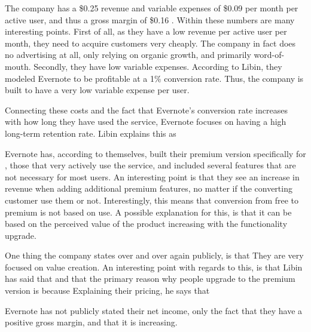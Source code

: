 The company has a \$0.25  revenue and variable expenses of \$0.09  per month per active user, and thus a gross margin of \$0.16 . Within these numbers are many interesting points. First of all, as they have a low revenue per active user per month, they need to acquire customers very cheaply. The company in fact does no advertising at all, only relying on organic growth, and primarily word-of-mouth. Secondly, they have low variable expenses. According to Libin, they modeled Evernote to be profitable at a 1\% conversion rate. Thus, the company is built to have a very low variable expense per user. 

Connecting these costs and the fact that Evernote's conversion rate increases with how long they have used the service, Evernote focuses on having a high long-term retention rate. Libin explains this as 

Evernote has, according to themselves, built their premium version specifically for , \ie those that very actively use the service, and included several features that are not necessary for most users. An interesting point is that they see an increase in revenue when adding additional premium features, no matter if the converting customer use them or not. Interestingly, this means that conversion from free to premium is not based on use. A possible explanation for this, is that it can be based on the perceived value of the product increasing with the functionality upgrade.

One thing the company states over and over again publicly, is that  They are very focused on value creation. An interesting point with regards to this, is that Libin has said that  and that the primary reason why people upgrade to the premium version is because  Explaining their pricing, he says that 

Evernote has not publicly stated their net income, only the fact that they have a positive gross margin, and that it is increasing.


